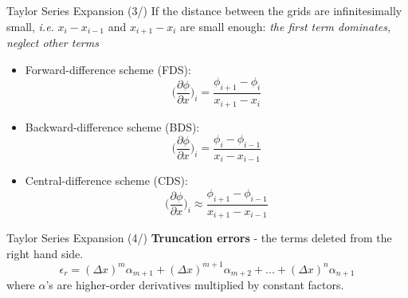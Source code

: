 \begin{frame}{Taylor Series Expansion (3/)}
If the distance between the grids are infinitesimally small, \textit{i.e.} $x_{i}-x_{i-1}$ and $x_{i+1}-x_{i}$ are small enough: \textit{the first term dominates, neglect other terms}
\begin{itemize}
    \item Forward-difference scheme (FDS): \[ \bigg(\frac{\partial \phi}{\partial x}\bigg)_{i} = \frac{\phi_{i+1}-\phi_{i}}{x_{i+1}-x_{i}}\]
    \item Backward-difference scheme (BDS): \[ \bigg(\frac{\partial \phi}{\partial x}\bigg)_{i} = \frac{\phi_{i}-\phi_{i-1}}{x_{i}-x_{i-1}}\]
    \item Central-difference scheme (CDS): \[ \bigg(\frac{\partial \phi}{\partial x}\bigg)_{i} \approx \frac{\phi_{i+1}-\phi_{i-1}}{x_{i+1}-x_{i-1}}\]
\end{itemize}
\end{frame}

\begin{frame}{Taylor Series Expansion (4/)}
\textbf{Truncation errors} - the terms deleted from the right hand side.
\[\epsilon_{r} = (\Delta x)^{m}\alpha_{m+1} + (\Delta x)^{m+1}\alpha_{m+2} + ...+ (\Delta x)^{n}\alpha_{n+1}\]
where $\alpha$'s are higher-order derivatives multiplied by constant factors.
\end{frame}